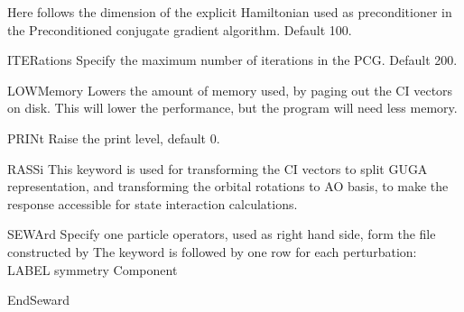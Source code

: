 \begin{keywordlist}
Here follows the dimension of the explicit Hamiltonian used as preconditioner
in the Preconditioned conjugate gradient algorithm. Default 100.
\item[ITERations]
Specify the maximum number of iterations in the PCG. Default 200.
\item[LOWMemory]
Lowers the amount of memory used, by paging out the CI vectors on disk.
This will lower the performance, but the program will need less memory.
\item[PRINt]
Raise the print level, default 0.
\item[RASSi]
This keyword is used for transforming the CI vectors to split GUGA
representation, and transforming the orbital rotations to AO basis,
to make the response accessible for state interaction calculations.
\item[SEWArd]
Specify one particle operators, used as right hand side, form the 
file constructed by 
The keyword is followed by one row for each perturbation:
LABEL symmetry Component
\item[EndSeward]

\end{keywordlist}
